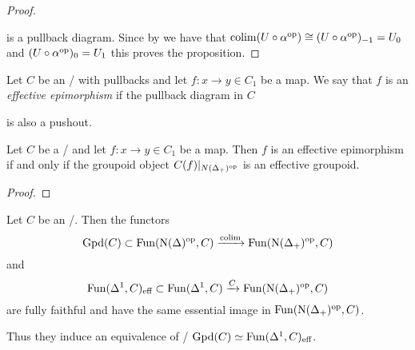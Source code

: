\begin{prop}
\begin{proof}
\begin{center}
        \end{center}
        is a pullback diagram.
        Since by %
        we have that $\operatorname{colim} (U\circ\alpha^{\operatorname{op}})\cong(U\circ\alpha^{\operatorname{op}})_{-1} = U_0$ and $(U\circ\alpha^{\operatorname{op}})_0=U_1$ this proves the proposition.
    \end{proof}
\end{prop}
\begin{definition}
    Let $C$ be an \inftycat/ with pullbacks and let $f\colon x\to y\in C_1$ be a map.
    We say that $f$ is an \emph{effective epimorphism} if the pullback diagram in $C$
    \begin{center}
    \end{center}
    is also a pushout. %
\end{definition}
\begin{prop}
    Let $C$ be a \inftytop/ and let $f\colon x\to y\in C_1$ be a map.
    Then $f$ is an effective epimorphism if and only if the groupoid object $C(f)|_{N(\Delta_+)^{\operatorname{op}}}$ is an effective groupoid.
    \begin{proof}
    \end{proof}
\end{prop}
\begin{prop}
    Let $C$ be an \inftytop/. 
    Then the functors
    \begin{equation*}
        \operatorname{Gpd}(C)\subset\operatorname{Fun}(\operatorname{N}(\Delta)^{\operatorname{op}},C)\xrightarrow{\operatorname{colim}}\operatorname{Fun}(\operatorname{N}(\Delta_+)^{\operatorname{op}},C)
    \end{equation*}
    and 
    \begin{equation*}
        \operatorname{Fun}(\Delta^1,C)_{\text{eff}}\subset\operatorname{Fun}(\Delta^1,C)\xrightarrow{C}\operatorname{Fun}(\operatorname{N}(\Delta_+)^{\operatorname{op}},C)
    \end{equation*}
    are fully faithful and have the same essential image in $\operatorname{Fun}(\operatorname{N}(\Delta_+)^{\operatorname{op}},C)$.

    Thus they induce an equivalence of \inftycats/ $\operatorname{Gpd}(C)\simeq\operatorname{Fun}(\Delta^1,C)_{\text{eff}}$.
\end{prop}
